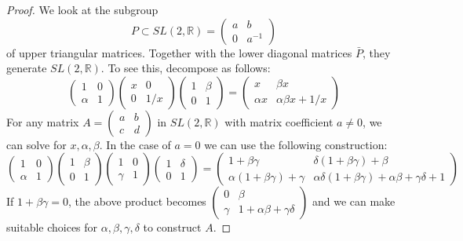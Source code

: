\documentclass[
  12pt
]{article}
\numberwithin{equation}{section}
\theoremstyle{plain}
\newtheorem*{proof}{Proof}
\begin{document}
  \begin{proof}
    \label{ref:lem:pf:decomp}
    We look at the subgroup
    \[P \subset SL(2, \mathbb{R}) = \begin{pmatrix}a & b \\ 0 & a^{-1}\end{pmatrix}\]
    of upper triangular matrices. Together with the lower diagonal matrices
    $\bar{P}$, they generate $SL(2, \mathbb{R})$. To see this, decompose
    as follows: \[\begin{pmatrix}1&0\\\alpha&1\end{pmatrix}
    \begin{pmatrix}x&0\\0&1/x\end{pmatrix}
    \begin{pmatrix}1&\beta\\0&1\end{pmatrix} = 
    \begin{pmatrix} x&\beta x\\\alpha x& \alpha\beta x+1/x\end{pmatrix}\]
    For any matrix $A = \begin{pmatrix}a & b \\ c & d\end{pmatrix}$ in
    $SL(2, \mathbb{R})$ with matrix coefficient $a \neq 0$, we can solve
    for $x,\alpha, \beta$. In the case of $a = 0$ we can use the
    following construction:
    \[
      \begin{pmatrix} 1&0\\\alpha&1\end{pmatrix}
      \begin{pmatrix} 1&\beta\\0&1\end{pmatrix}
      \begin{pmatrix} 1&0\\\gamma&1\end{pmatrix}
      \begin{pmatrix} 1&\delta\\0&1\end{pmatrix}=
      \begin{pmatrix}
        1+\beta\gamma&\delta(1+\beta\gamma)+\beta\\
        \alpha(1+\beta\gamma)+\gamma&\alpha\delta(1+\beta\gamma)+\alpha\beta+\gamma\delta+1
      \end{pmatrix}
    \]
    If $1 + \beta\gamma = 0$, the above product becomes
    $\begin{pmatrix} 0&\beta\\ \gamma& 1+\alpha\beta+\gamma\delta \end{pmatrix}$
    and we can make suitable choices for $\alpha, \beta, \gamma, \delta$
    to construct $A$.


\end{proof}
\end{document}
